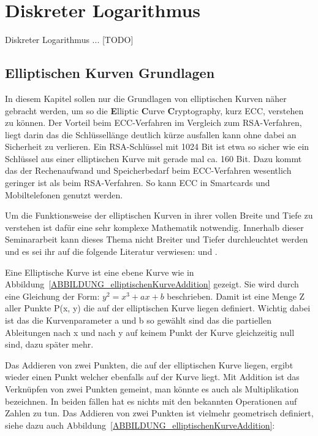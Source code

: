 \section{Diskreter Logarithmus}
	Diskreter Logarithmus ... [TODO]
	
	\subsection{Elliptischen Kurven Grundlagen}
		In diesem Kapitel sollen nur die Grundlagen von elliptischen Kurven näher gebracht werden, um so die \textbf{E}lliptic \textbf{C}urve \textbf{C}ryptography, kurz ECC, verstehen zu können. Der Vorteil beim ECC-Verfahren im Vergleich zum RSA-Verfahren, liegt darin das die Schlüssellänge deutlich kürze ausfallen kann ohne dabei an Sicherheit zu verlieren. Ein RSA-Schlüssel mit 1024 Bit ist etwa so sicher wie ein Schlüssel aus einer elliptischen Kurve mit gerade mal ca. 160 Bit. Dazu kommt das der Rechenaufwand und Speicherbedarf beim ECC-Verfahren wesentlich geringer ist als beim RSA-Verfahren. So kann ECC in Smartcards und Mobiltelefonen genutzt werden.\cite{Information:und:Kommunikation}
				
		Um die Funktionsweise der elliptischen Kurven in ihrer vollen Breite und Tiefe zu verstehen ist dafür eine sehr komplexe Mathematik notwendig. Innerhalb dieser Seminararbeit kann dieses Thema nicht Breiter und Tiefer durchleuchtet werden und es sei ihr auf die folgende Literatur verwiesen: \cite{Information:und:Kommunikation} und \cite{Kryptographie:und:IT-Sicherheit}.
		
		Eine Elliptische Kurve ist eine ebene Kurve wie in Abbildung~\ref{ABBILDUNG_elliptischenKurveAddition} gezeigt. Sie wird durch eine Gleichung der Form: $y^2 = x^3 + ax +b$ beschrieben. Damit ist eine Menge Z aller Punkte P(x, y) die auf der elliptischen Kurve liegen definiert. Wichtig dabei ist das die Kurvenparameter a und b so gewählt sind das die partiellen Ableitungen nach x und nach y auf keinem Punkt der Kurve gleichzeitig null sind, dazu später mehr.
		
		Das Addieren von zwei Punkten, die auf der elliptischen Kurve liegen, ergibt wieder einen Punkt welcher ebenfalls auf der Kurve liegt.\cite{Information:und:Kommunikation} Mit Addition ist das Verknüpfen von zwei Punkten gemeint, man könnte es auch als Multiplikation bezeichnen. In beiden fällen hat es nichts mit den bekannten Operationen auf Zahlen zu tun. Das Addieren von zwei Punkten ist vielmehr geometrisch definiert, siehe dazu auch Abbildung~\ref{ABBILDUNG_elliptischenKurveAddition}:
		
